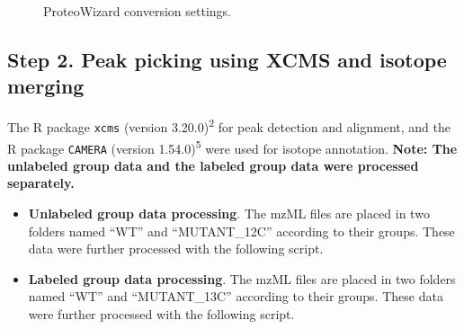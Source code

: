 \documentclass[
  letterpaper,
  DIV=11,
  numbers=noendperiod]{scrreprt}
\providecommand{\tightlist}{%
  \setlength{\itemsep}{0pt}\setlength{\parskip}{0pt}}
\begin{document}
\begin{figure}


\caption{\label{fig-figure2-2}ProteoWizard conversion settings.}

\end{figure}%

\subsection{Step 2. Peak picking using XCMS and isotope
merging}\label{step-2.-peak-picking-using-xcms-and-isotope-merging}

The R package \texttt{xcms} (version 3.20.0)\textsuperscript{2} for peak
detection and alignment, and the R package \texttt{CAMERA} (version
1.54.0)\textsuperscript{5} were used for isotope annotation.
\textbf{Note: The unlabeled group data and the labeled group data were
processed separately.}

\begin{itemize}
\tightlist
\item
  \textbf{Unlabeled group data processing}. The mzML files are placed in
  two folders named ``WT'' and ``MUTANT\_12C'' according to their
  groups. These data were further processed with the following script.
\item
  \textbf{Labeled group data processing}. The mzML files are placed in
  two folders named ``WT'' and ``MUTANT\_13C'' according to their
  groups. These data were further processed with the following script.
\end{itemize}
\end{document}

